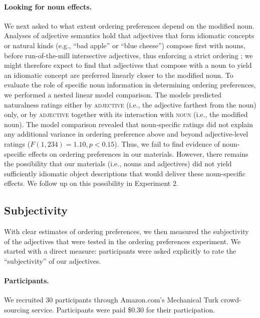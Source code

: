 \documentclass[12pt]{article}
\begin{document}
\paragraph{Looking for noun effects.} We next asked to what extent ordering preferences depend on the modified noun. Analyses of adjective semantics hold that adjectives that form idiomatic concepts or natural kinds (e.g., ``bad apple'' or ``blue cheese'') compose first with nouns, before run-of-the-mill intersective adjectives, thus enforcing a strict ordering \citep{McNally2004,svenonius2008}; we might therefore expect to find that adjectives that compose with a noun to yield an idiomatic concept are preferred linearly closer to the modified noun. 
To evaluate the role of specific noun information in determining ordering preferences, we performed a nested linear model comparison. The models predicted naturalness ratings either by \textsc{adjective} (i.e., the adjective farthest from the noun) only, or by \textsc{adjective} together with its interaction with \textsc{noun} (i.e., the modified noun).
The model comparison revealed that noun-specific ratings did not explain any additional variance in ordering preference above and beyond adjective-level ratings ($F(1,234) = 1.10, p < 0.15$).  Thus, we fail to find evidence of noun-specific effects on ordering preferences in our materials. However, there remains the possibility that our materials (i.e., nouns and adjectives) did not yield sufficiently idiomatic object descriptions that would deliver these noun-specific effects. We follow up on this possibility in Experiment 2.


\subsection{Subjectivity}

With clear estimates of ordering preferences, we then measured the subjectivity of the adjectives that were tested in the ordering preferences experiment. We started with a direct measure: participants were asked explicitly to rate the ``subjectivity'' of our adjectives.

\paragraph{Participants.} We recruited 30 participants through Amazon.com's Mechanical Turk crowd-sourcing service. Participants were paid \$0.30 for their participation. 
\end{document}

